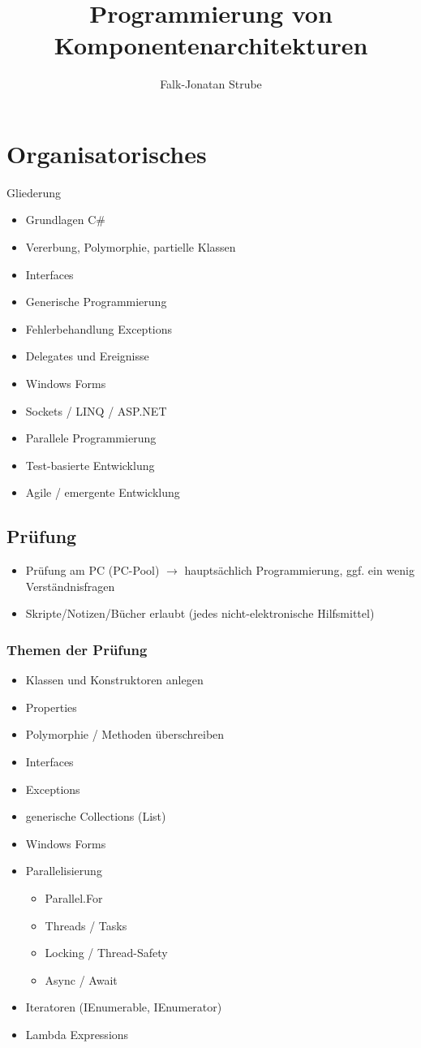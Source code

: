 \documentclass{scrreprt}
\title{Programmierung von Komponentenarchitekturen}
\author{Falk-Jonatan Strube}
\begin{document}
\maketitle
\tableofcontents

\chapter*{Organisatorisches}
Gliederung
\begin{itemize}
\item Grundlagen C\#
\item Vererbung, Polymorphie, partielle Klassen
\item Interfaces
\item Generische Programmierung
\item Fehlerbehandlung Exceptions
\item Delegates und Ereignisse
\item Windows Forms
\item Sockets / LINQ / ASP.NET
\item Parallele Programmierung
\item Test-basierte Entwicklung
\item Agile / emergente Entwicklung 
\end{itemize}

\section*{Prüfung}
\begin{itemize}
\item Prüfung am PC (PC-Pool) $\to$ hauptsächlich Programmierung, ggf. ein wenig Verständnisfragen
\item Skripte/Notizen/Bücher erlaubt (jedes nicht-elektronische Hilfsmittel)
\end{itemize}

\subsection*{Themen der Prüfung}
\begin{itemize}
\item Klassen und Konstruktoren anlegen
\item Properties
\item Polymorphie / Methoden überschreiben
\item Interfaces
\item Exceptions
\item generische Collections (List)
\item Windows Forms
\item Parallelisierung
\begin{itemize}
\item Parallel.For
\item Threads / Tasks
\item Locking / Thread-Safety
\item Async / Await
\end{itemize}
\item Iteratoren (IEnumerable, IEnumerator)
\item Lambda Expressions
\end{itemize}
\end{document}
